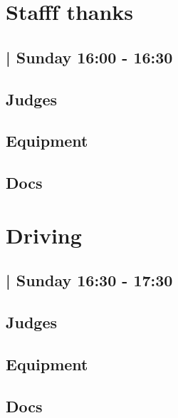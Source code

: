 \documentclass[10pt]{article}
\begin{document}
		\begin{minipage}{\linewidth}
		\setcounter{section}{52}
	\section{Stafff thanks }
	\subsection*{ | Sunday 16:00 - 16:30}

	

	\begin{multicols}{2}
	\subsection*{\faUsers \: Judges}
	\begin{itemize}
		\end{itemize}
	\columnbreak
	\subsection*{\faWrench \: Equipment}
	        \vfill\null
        \subsection*{\faFile \: Docs}
     	\end{multicols}


	\vspace{1cm}
	\end{minipage}

		\begin{minipage}{\linewidth}
		\setcounter{section}{53}
	\section{Driving }
	\subsection*{ | Sunday 16:30 - 17:30}

	

	\begin{multicols}{2}
	\subsection*{\faUsers \: Judges}
	\begin{itemize}
		\end{itemize}
	\columnbreak
	\subsection*{\faWrench \: Equipment}
	        \vfill\null
        \subsection*{\faFile \: Docs}
     	\end{multicols}


	\vspace{1cm}
	\end{minipage}

	
\end{document}
